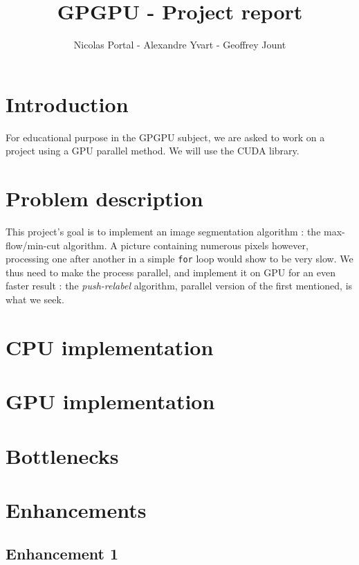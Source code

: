 \documentclass{article}
\title{GPGPU - Project report}
\author{Nicolas Portal - Alexandre Yvart - Geoffrey Jount}
\begin{document}
\maketitle


\pagebreak
\tableofcontents


\pagebreak
{}

\section{Introduction}

For educational purpose in the GPGPU subject, we are asked to work on a project
using a GPU parallel method. We will use the CUDA library.

\section{Problem description}

This project's goal is to implement an image segmentation algorithm :
the max-flow/min-cut algorithm. A picture containing numerous pixels however,
processing one after another in a simple \texttt{for} loop would show to be
very slow. We thus need to make the process parallel, and implement it on GPU
for an even faster result : the \textit{push-relabel} algorithm, parallel
version of the first mentioned, is what we seek.

\section{CPU implementation}

\section{GPU implementation}

\section{Bottlenecks}

\section{Enhancements}

\subsection{Enhancement 1}
\end{document}
